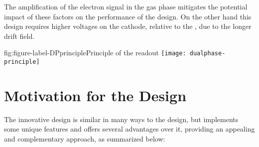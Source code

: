 The amplification of the electron signal in the gas phase mitigates the potential impact of these factors on the performance of the \dual design.  On the other hand this design requires  higher voltages on the cathode, relative to the \single, due to the longer drift field. 


\begin{dunefigure}{fig:figure-label-DPprinciple}{Principle of the \dual readout}
\texttt{[image: dualphase-principle]}
\end{dunefigure}

\section{Motivation for the \dual Design} %
\label{sec:fddp-design-motivation}


The innovative \dual design is similar in many ways to the \single design, but implements some unique features and offers several advantages over it, providing an appealing and complementary approach, as summarized below:


